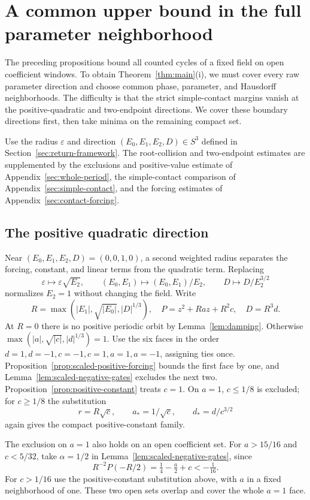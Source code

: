 \section{A common upper bound in the full parameter neighborhood}
\label{sec:parameter-cover}\label{sec:upper-main}
The preceding propositions bound all counted cycles of a fixed field
on open coefficient windows. To obtain Theorem~\ref{thm:main}(i), we
must cover every raw parameter direction and choose common phase,
parameter, and Hausdorff neighborhoods. The difficulty is that the
strict simple-contact margins vanish at the positive-quadratic and
two-endpoint directions. We cover these boundary directions first,
then take minima on the remaining compact set.

Use the radius $\varepsilon$ and direction $(E_0,E_1,E_2,D)\in S^3$
defined in Section~\ref{sec:return-framework}. The root-collision and
two-endpoint estimates are supplemented by the
exclusions and positive-value estimate of Appendix~\ref{sec:whole-period},
the simple-contact comparison of Appendix~\ref{sec:simple-contact},
and the forcing estimates of Appendix~\ref{sec:contact-forcing}.

\subsection{The positive quadratic direction}
Near $(E_0,E_1,E_2,D)=(0,0,1,0)$, a second weighted radius separates
the forcing, constant, and linear terms from the quadratic term.
Replacing
\[
 \varepsilon\mapsto\varepsilon\sqrt{E_2},\qquad
 (E_0,E_1)\mapsto(E_0,E_1)/E_2,\qquad D\mapsto D/E_2^{3/2}
\]
normalizes $E_2=1$ without changing the field. Write
\begin{equation}\label{eq:coefficient-sphere}
 R=\max(|E_1|,\sqrt{|E_0|},|D|^{1/3}),\quad
 P=z^2+Ra z+R^2c,\quad D=R^3d.
\end{equation}
At $R=0$ there is no positive periodic orbit by
Lemma~\ref{lem:damping}. Otherwise
$\max(|a|,\sqrt{|c|},|d|^{1/3})=1$. Use the six faces in
the order $d=1,d=-1,c=-1,c=1,a=1,a=-1$, assigning ties once.
Proposition~\ref{prop:scaled-positive-forcing} bounds the first face
by one, and Lemma~\ref{lem:scaled-negative-gates} excludes the next
two. Proposition~\ref{prop:positive-constant} treats $c=1$.
On $a=1$, $c\le1/8$
is excluded; for $c\ge1/8$ the substitution
\[
r=R\sqrt c,\qquad a_*=1/\sqrt c,\qquad d_*=d/c^{3/2}
\]
again gives the compact positive-constant family.

The exclusion on $a=1$ also holds on an open coefficient set.  For
$a>15/16$ and $c<5/32$, take $\alpha=1/2$ in
Lemma~\ref{lem:scaled-negative-gates}, since
\[
 R^{-2}P(-R/2)=\tfrac14-\tfrac a2+c<-\tfrac1{16}.
\]
For $c>1/16$ use the positive-constant substitution above, with $a$
in a fixed neighborhood of one.  These two open sets overlap and
cover the whole $a=1$ face.

